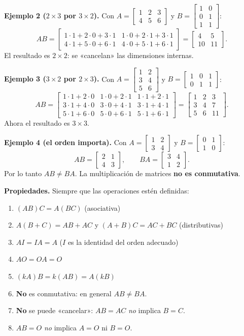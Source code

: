 \documentclass[12pt, letterpaper]{article}
\newcommand{\mwmat}[1]{\ensuremath{\begin{bmatrix}#1\end{bmatrix}}}
\begin{document}
\begin{cuadrosolucion}
  \small
  \textbf{Ejemplo 2 ($2\times3$ por $3\times2$).} Con
  $A=\mwmat{1&2&3\\4&5&6}$ y $B=\mwmat{1&0\\0&1\\1&1}$:
  \[
    AB=\mwmat{
      1\cdot1+2\cdot0+3\cdot1 & 1\cdot0+2\cdot1+3\cdot1\\
      4\cdot1+5\cdot0+6\cdot1 & 4\cdot0+5\cdot1+6\cdot1}
      =\mwmat{4&5\\10&11}.
  \]
  El resultado es $2\times2$: se «cancelan» las dimensiones internas.
\end{cuadrosolucion}

\begin{cuadrosolucion}
  \small
  \textbf{Ejemplo 3 ($3\times2$ por $2\times3$).} Con
  $A=\mwmat{1&2\\3&4\\5&6}$ y $B=\mwmat{1&0&1\\0&1&1}$:
  \[
    AB=\mwmat{
      1\cdot1+2\cdot0 & 1\cdot0+2\cdot1 & 1\cdot1+2\cdot1\\
      3\cdot1+4\cdot0 & 3\cdot0+4\cdot1 & 3\cdot1+4\cdot1\\
      5\cdot1+6\cdot0 & 5\cdot0+6\cdot1 & 5\cdot1+6\cdot1}
      =\mwmat{1&2&3\\3&4&7\\5&6&11}.
  \]
  Ahora el resultado es $3\times3$.
\end{cuadrosolucion}

\begin{cuadrosolucion}
  \small
  \textbf{Ejemplo 4 (el orden importa).} Con
  $A=\mwmat{1&2\\3&4}$ y $B=\mwmat{0&1\\1&0}$:
  \[
    AB=\mwmat{2&1\\4&3},
    \qquad
    BA=\mwmat{3&4\\1&2}.
  \]
  Por lo tanto $AB\neq BA$. La multiplicación de matrices \textbf{no es
  conmutativa}.
\end{cuadrosolucion}

\begin{cuadroteoria}
  \small
  \textbf{Propiedades.} Siempre que las operaciones estén definidas:
  \begin{enumerate}[leftmargin=1.4em, nosep]
    \item $(AB)C=A(BC)$ \quad (asociativa)
    \item $A(B+C)=AB+AC$ \quad y \quad $(A+B)C=AC+BC$ \quad (distributivas)
    \item $AI=IA=A$ \quad ($I$ es la identidad del orden adecuado)
    \item $AO=OA=O$
    \item $(kA)B=k(AB)=A(kB)$
    \item \textbf{No} es conmutativa: en general $AB\neq BA$.
    \item \textbf{No} se puede «cancelar»: $AB=AC$ \emph{no} implica $B=C$.
    \item $AB=O$ \emph{no} implica $A=O$ ni $B=O$.
  \end{enumerate}
\end{cuadroteoria}
\end{document}
